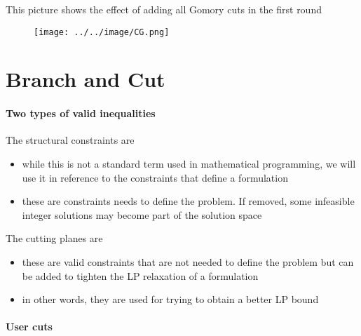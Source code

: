                 This picture shows the effect of adding all Gomory cuts in the first round
                \begin{figure}[!h]
                    \centering
                    \texttt{[image: ../../image/CG.png]}
                \end{figure}

    \section{Branch and Cut}
        \paragraph{Two types of valid inequalities}
            The structural constraints are 
            \begin{itemize}
                \item while this is not a standard term used in mathematical programming, we will use it in reference to the constraints that define a formulation
                \item these are constraints needs to define the problem. If removed, some infeasible integer solutions may become part of the solution space
            \end{itemize}

            The cutting planes are
            \begin{itemize}
                \item these are valid constraints that are not needed to define the problem but can be added to tighten the LP relaxation of a formulation
                \item in other words, they are used for trying to obtain a better LP bound
            \end{itemize}

        \paragraph{User cuts}


